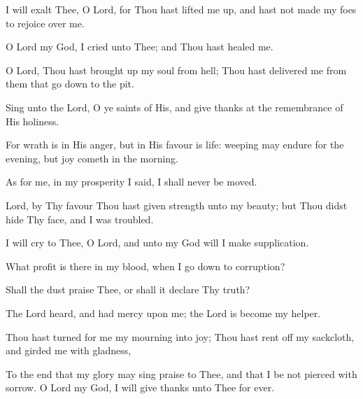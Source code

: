 I will exalt Thee, O Lord, for Thou hast lifted me up, and hast not made my foes to rejoice over me.

O Lord my God, I cried unto Thee; and Thou hast healed me.

O Lord, Thou hast brought up my soul from hell; Thou hast delivered me from them that go down to the pit.

Sing unto the Lord, O ye saints of His, and give thanks at the remembrance of His holiness.

For wrath is in His anger, but in His favour is life: weeping may endure for the evening, but joy cometh in the morning.

As for me, in my prosperity I said, I shall never be moved.

Lord, by Thy favour Thou hast given strength unto my beauty; but Thou didst hide Thy face, and I was troubled.

I will cry to Thee, O Lord, and unto my God will I make supplication.

What profit is there in my blood, when I go down to corruption?

Shall the dust praise Thee, or shall it declare Thy truth?

The Lord heard, and had mercy upon me; the Lord is become my helper.

Thou hast turned for me my mourning into joy; Thou hast rent off my sackcloth, and girded me with gladness,

To the end that my glory may sing praise to Thee, and that I be not pierced with sorrow. O Lord my God, I will give thanks unto Thee for ever.
